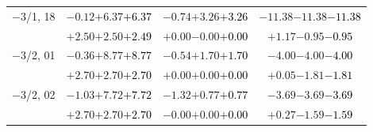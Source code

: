 \documentclass[compress]{beamer}
\begin{document}
\begin{frame}
\begin{tabular}{r | c | c | c}
$-$3/1, 18 & $-0.12$\hspace{0.1 cm}$+6.37$\hspace{0.1 cm}\textcolor{black}{$+6.37$} & $-0.74$\hspace{0.1 cm}$+3.26$\hspace{0.1 cm}\textcolor{black}{$+3.26$} & $-11.38$\hspace{0.1 cm}$-11.38$\hspace{0.1 cm}\textcolor{black}{$-11.38$} \\
           & $+2.50$\hspace{0.1 cm}$+2.50$\hspace{0.1 cm}\textcolor{black}{$+2.49$} & $+0.00$\hspace{0.1 cm}$-0.00$\hspace{0.1 cm}\textcolor{black}{$+0.00$} & $+1.17$\hspace{0.1 cm}$-0.95$\hspace{0.1 cm}\textcolor{black}{$-0.95$} \\
$-$3/2, 01 & $-0.36$\hspace{0.1 cm}$+8.77$\hspace{0.1 cm}\textcolor{black}{$+8.77$} & $-0.54$\hspace{0.1 cm}$+1.70$\hspace{0.1 cm}\textcolor{black}{$+1.70$} & $-4.00$\hspace{0.1 cm}$-4.00$\hspace{0.1 cm}\textcolor{black}{$-4.00$} \\
           & $+2.70$\hspace{0.1 cm}$+2.70$\hspace{0.1 cm}\textcolor{black}{$+2.70$} & $+0.00$\hspace{0.1 cm}$+0.00$\hspace{0.1 cm}\textcolor{black}{$+0.00$} & $+0.05$\hspace{0.1 cm}$-1.81$\hspace{0.1 cm}\textcolor{black}{$-1.81$} \\
$-$3/2, 02 & $-1.03$\hspace{0.1 cm}$+7.72$\hspace{0.1 cm}\textcolor{black}{$+7.72$} & $-1.32$\hspace{0.1 cm}$+0.77$\hspace{0.1 cm}\textcolor{black}{$+0.77$} & $-3.69$\hspace{0.1 cm}$-3.69$\hspace{0.1 cm}\textcolor{black}{$-3.69$} \\
           & $+2.70$\hspace{0.1 cm}$+2.70$\hspace{0.1 cm}\textcolor{black}{$+2.70$} & $-0.00$\hspace{0.1 cm}$+0.00$\hspace{0.1 cm}\textcolor{black}{$+0.00$} & $+0.27$\hspace{0.1 cm}$-1.59$\hspace{0.1 cm}\textcolor{black}{$-1.59$} \\

\end{tabular}
\end{frame}
\end{document}
